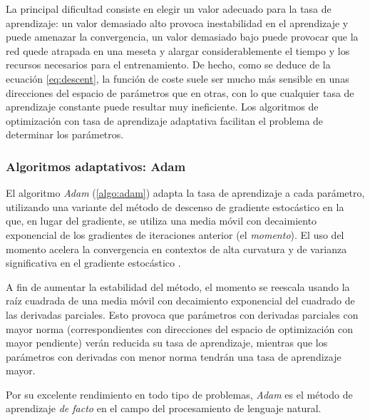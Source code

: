 La principal dificultad consiste en elegir un valor adecuado para la tasa de aprendizaje: un valor demasiado alto provoca inestabilidad en el aprendizaje y puede amenazar la convergencia, un valor demasiado bajo puede provocar que la red quede atrapada en una meseta y alargar considerablemente el tiempo y los recursos necesarios para el entrenamiento. De hecho, como se deduce de la ecuación \eqref{eq:descent}, la función de coste suele ser mucho más sensible en unas direcciones del espacio de parámetros que en otras, con lo que cualquier tasa de aprendizaje constante puede resultar muy ineficiente. Los algoritmos de optimización con tasa de aprendizaje adaptativa facilitan el problema de determinar los parámetros.

\subsubsection{Algoritmos adaptativos: Adam}
El algoritmo \textit{Adam} (\cref{algo:adam}) adapta la tasa de aprendizaje a cada parámetro, utilizando una variante del método de descenso de gradiente estocástico en la que, en lugar del gradiente, se utiliza una media móvil con decaimiento exponencial de los gradientes de iteraciones anterior (el \textit{momento}). El uso del momento acelera la convergencia en contextos de alta curvatura y de varianza significativa en el gradiente estocástico \cite{polyak1964some}.

A fin de aumentar la estabilidad del método, el momento se reescala usando la raíz cuadrada de una media móvil con decaimiento exponencial del cuadrado de las derivadas parciales. Esto provoca que parámetros con derivadas parciales con mayor norma (correspondientes con direcciones del espacio de optimización con mayor pendiente) verán reducida su tasa de aprendizaje, mientras que los parámetros con derivadas con menor norma tendrán una tasa de aprendizaje mayor. 

Por su excelente rendimiento en todo tipo de problemas, \textit{Adam} es el método de aprendizaje \textit{de facto} en el campo del procesamiento de lenguaje natural.


